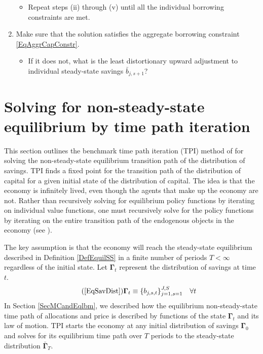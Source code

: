 \documentclass[letterpaper,12pt]{article}
\theoremstyle{definition}
\begin{document}
\begin{enumerate}
\begin{itemize}
        \item Repeat steps (ii) through (v) until all the individual borrowing constraints are met.
      \end{itemize}
    \item Make sure that the solution satisfies the aggregate borrowing constraint \eqref{EqAggrCapConstr}.
      \begin{itemize}
        \item If it does not, what is the least distortionary upward adjustment to individual steady-state savings $\bar{b}_{j,s+1}$?
      \end{itemize}
  \end{enumerate}


\newpage
\section{Solving for non-steady-state equilibrium by time path iteration}\label{AppNonSSsolve}

  \setcounter{equation}{0}

  This section outlines the benchmark time path iteration (TPI) method of \citet{AuerbachKotlikoff:1987} for solving the non-steady-state equilibrium transition path of the distribution of savings. TPI finds a fixed point for the transition path of the distribution of capital for a given initial state of the distribution of capital. The idea is that the economy is infinitely lived, even though the agents that make up the economy are not. Rather than recursively solving for equilibrium policy functions by iterating on individual value functions, one must recursively solve for the policy functions by iterating on the entire transition path of the endogenous objects in the economy (see \citet[ch. 17]{StokeyLucas:1989}).

  The key assumption is that the economy will reach the steady-state equilibrium described in Definition \ref{DefEquilSS} in a finite number of periods $T<\infty$ regardless of the initial state. Let $\bm{\Gamma}_t$ represent the distribution of savings at time $t$.
  \begin{equation}\tag{\ref{EqSavDist}}
    \bm{\Gamma}_t \equiv \{b_{j,s,t}\}_{j=1,s=1}^{J,S} \quad\forall t
  \end{equation}
  In Section \ref{SecMCandEqlbm}, we described how the equilibrium non-steady-state time path of allocations and price is described by functions of the state $\bm{\Gamma}_t$ and its law of motion. TPI starts the economy at any initial distribution of savings $\bm{\Gamma}_0$ and solves for its equilibrium time path over $T$ periods to the steady-state distribution $\bar{\bm{\Gamma}}_T$.
\end{document}

